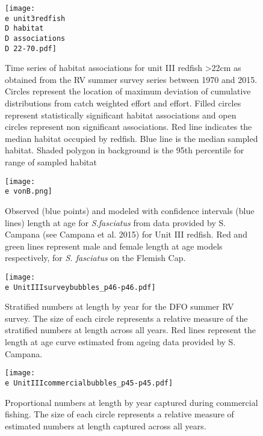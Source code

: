 \documentclass[11pt]{article}
\newcommand{\D}{.}
\newcommand{\e}{/home/ecomod_data/redfish/figures/}
\begin{document}
\begin{figure}
\centering
    
    \texttt{[image: \\e unit3redfish\\D habitat\\D associations\\D 22-70.pdf]}
    \caption{Time series of habitat associations for unit III redfish \textgreater 22cm as obtained from the RV summer survey
series between 1970 and 2015. Circles represent the location of maximum deviation of
cumulative distributions from catch weighted effort and effort. Filled circles represent statistically
significant habitat associations and open circles represent non significant associations. Red line indicates
the median habitat occupied by redfish. Blue line is the median sampled habitat. Shaded polygon in
background is the 95th percentile for range of sampled habitat}
\end{figure}
\clearpage



\begin{figure}
\centering
    
    \texttt{[image: \\e vonB.png]}
    \caption{Observed (blue points) and modeled with confidence intervals (blue lines) length at age for \emph{S.fasciatus} from data provided by S. Campana (see Campana et al. 2015) for Unit III redfish. Red and green lines represent male and female length at age models respectively, for \emph{S. fasciatus} on the Flemish Cap.}

\end{figure}
\clearpage



\begin{landscape}
\begin{figure}
\centering
    
    \texttt{[image: \\e UnitIIIsurveybubbles\_p46-p46.pdf]}
    \caption{Stratified numbers at length by year for the DFO summer RV survey. The size of each circle represents a relative measure of the stratified numbers at length across all years. Red lines represent the length at age curve estimated from ageing data provided by S. Campana.}

\end{figure}
\clearpage


\begin{figure}
\centering
    
    \texttt{[image: \\e UnitIIIcommercialbubbles\_p45-p45.pdf]}
    \caption{Proportional numbers at length by year captured during commercial fishing. The size of each circle represents a relative measure of estimated numbers at length captured across all years. }

\end{figure}
\clearpage
\end{landscape}
\end{document}

